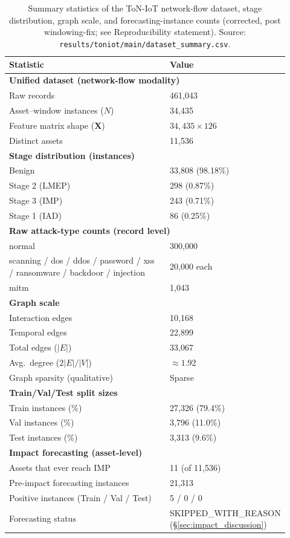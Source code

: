 \documentclass[pdflatex,sn-mathphys-num]{sn-jnl}
\theoremstyle{thmstyleone}%
\theoremstyle{thmstyletwo}%
\theoremstyle{thmstylethree}%
\begin{document}
\begin{table}[!t]
\centering
\caption{Summary statistics of the ToN-IoT network-flow dataset, stage distribution, graph scale, and forecasting-instance counts (corrected, post windowing-fix; see Reproducibility statement). Source: \texttt{results/toniot/main/dataset\_summary.csv}.}
\label{tab:summary_stats_from_logs}
\renewcommand{\arraystretch}{1.12}
\begin{tabular}{p{0.62\linewidth} p{0.30\linewidth}}
\toprule
\textbf{Statistic} & \textbf{Value} \\
\midrule
\multicolumn{2}{l}{\textbf{Unified dataset (network-flow modality)}}\\
Raw records & 461{,}043 \\
Asset--window instances ($N$) & 34{,}435 \\
Feature matrix shape ($\mathbf{X}$) & $34{,}435 \times 126$ \\
Distinct assets & 11{,}536 \\
\midrule
\multicolumn{2}{l}{\textbf{Stage distribution (instances)}}\\
Benign & 33{,}808 (98.18\%) \\
Stage 2 (LMEP) & 298 (0.87\%) \\
Stage 3 (IMP) & 243 (0.71\%) \\
Stage 1 (IAD) & 86 (0.25\%) \\
\midrule
\multicolumn{2}{l}{\textbf{Raw attack-type counts (record level)}}\\
normal & 300{,}000 \\
scanning / dos / ddos / password / xss / ransomware / backdoor / injection & 20{,}000 each \\
mitm & 1{,}043 \\
\midrule
\multicolumn{2}{l}{\textbf{Graph scale}}\\
Interaction edges & 10{,}168 \\
Temporal edges & 22{,}899 \\
Total edges ($|E|$) & 33{,}067 \\
Avg.\ degree ($2|E|/|V|$) & $\approx 1.92$ \\
Graph sparsity (qualitative) & Sparse \\
\midrule
\multicolumn{2}{l}{\textbf{Train/Val/Test split sizes}}\\
Train instances (\%) & 27{,}326 (79.4\%) \\
Val instances (\%) & 3{,}796 (11.0\%) \\
Test instances (\%) & 3{,}313 (9.6\%) \\
\midrule
\multicolumn{2}{l}{\textbf{Impact forecasting (asset-level)}}\\
Assets that ever reach IMP & 11 (of 11{,}536) \\
Pre-impact forecasting instances & 21{,}313 \\
Positive instances (Train / Val / Test) & 5 / 0 / 0 \\
Forecasting status & SKIPPED\_WITH\_REASON (\S\ref{sec:impact_discussion}) \\
\bottomrule
\end{tabular}
\end{table}
\end{document}
